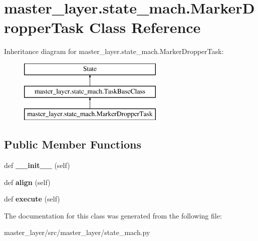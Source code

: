 \hypertarget{classmaster__layer_1_1state__mach_1_1MarkerDropperTask}{}\section{master\+\_\+layer.\+state\+\_\+mach.\+Marker\+Dropper\+Task Class Reference}
\label{classmaster__layer_1_1state__mach_1_1MarkerDropperTask}
Inheritance diagram for master\+\_\+layer.\+state\+\_\+mach.\+Marker\+Dropper\+Task\+:\begin{figure}[H]
\begin{center}
\leavevmode
\includegraphics[height=3.000000cm]{classmaster__layer_1_1state__mach_1_1MarkerDropperTask}
\end{center}
\end{figure}
\subsection*{Public Member Functions}
\begin{DoxyCompactItemize}
\item 
\mbox{\label{classmaster__layer_1_1state__mach_1_1MarkerDropperTask_aeaee4f4556ded94b0c4c714fd36cef3d}} 
def {\bfseries \+\_\+\+\_\+init\+\_\+\+\_\+} (self)
\item 
\mbox{\label{classmaster__layer_1_1state__mach_1_1MarkerDropperTask_a4f87206008f89058c4745cb69d43d7fc}} 
def {\bfseries align} (self)
\item 
\mbox{\label{classmaster__layer_1_1state__mach_1_1MarkerDropperTask_aa334686bbb38eb471793471c81264218}} 
def {\bfseries execute} (self)
\end{DoxyCompactItemize}


The documentation for this class was generated from the following file\+:\begin{DoxyCompactItemize}
\item 
master\+\_\+layer/src/master\+\_\+layer/state\+\_\+mach.\+py\end{DoxyCompactItemize}

